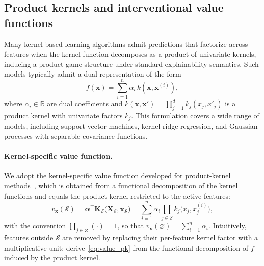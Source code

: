 \documentclass{article}
\newcommand{\cS}{\mathcal{S}}
\newcommand{\X}{\mathbf{X}}
\newcommand{\x}{\mathbf{x}}
\newcommand{\alphab}{\boldsymbol{\alpha}}
\newcommand{\K}{\mathbf{K}}
\begin{document}
\subsection{Product kernels and interventional value functions}
\label{sec:product_kernels}

Many kernel-based learning algorithms admit predictions that factorize across features when the kernel function decomposes as a product of univariate kernels, inducing a product-game structure under standard explainability semantics. Such models typically admit a dual representation of the form
\begin{equation}
\label{eq:dual_prediction_pk}
f(\x)
=
\sum_{i=1}^n \alpha_i\, k(\x,\x^{(i)}),
\end{equation}
where $\alpha_i \in \mathbb{R}$ are dual coefficients and
$
k(\x,\x')
=
\prod_{j=1}^d k_j(x_j,x'_j)
$
is a product kernel with univariate factors $k_j$.
This formulation covers a wide range of models, including support vector machines, kernel ridge regression,
and Gaussian processes with separable covariance functions.

\paragraph{Kernel-specific value function.}
We adopt the kernel-specific value function developed for product-kernel methods~\citep{pkex_shapley}, which is obtained from a functional decomposition of the kernel functions and equals the product kernel restricted to the active features:
\begin{equation}
\label{eq:value_pk}
v_{\x}(\cS) = \alphab^{\top}\K_{\cS}\bigl(\X_{\cS},\x_{\cS}\bigr)
=
\sum_{i=1}^n \alpha_i \prod_{j\in\cS} k_j\bigl(x_j, x^{(i)}_j\bigr),
\end{equation}
with the convention $\prod_{j\in\varnothing}(\cdot)=1$, so that $v_{\x}(\varnothing)=\sum_{i=1}^n \alpha_i$.
Intuitively, features outside $\cS$ are removed by replacing their per-feature kernel factor with a multiplicative unit; \citet{pkex_shapley} derive~\cref{eq:value_pk} from the functional decomposition of $f$ induced by the product kernel.
\end{document}

